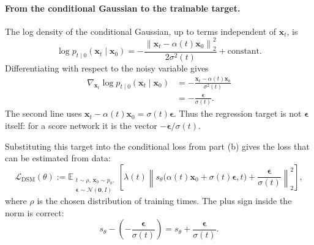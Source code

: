 \documentclass[11pt,a4paper]{article}
\theoremstyle{definition}
\begin{document}
\paragraph{From the conditional Gaussian to the trainable target.}
The log density of the conditional Gaussian, up to terms independent of
$\mathbf{x}_t$, is
\[
\log p_{t\mid 0}(\mathbf{x}_t\mid\mathbf{x}_0)
=-\frac{
\left\|
\mathbf{x}_t-\alpha(t)\mathbf{x}_0
\right\|_2^2}
{2\sigma^2(t)}
+\text{constant}.
\]
Differentiating with respect to the noisy variable gives
\[
\begin{aligned}
\nabla_{\mathbf{x}_t}
\log p_{t\mid 0}(\mathbf{x}_t\mid\mathbf{x}_0)
&=
-\frac{
\mathbf{x}_t-\alpha(t)\mathbf{x}_0}
{\sigma^2(t)}\\
&=
-\frac{\boldsymbol{\epsilon}}{\sigma(t)}.
\end{aligned}
\]
The second line uses
$\mathbf{x}_t-\alpha(t)\mathbf{x}_0
=\sigma(t)\boldsymbol{\epsilon}$. Thus the regression target is not
$\boldsymbol{\epsilon}$ itself: for a score network it is the vector
$-\boldsymbol{\epsilon}/\sigma(t)$.

Substituting this target into the conditional loss from part (b) gives the loss that can
be estimated from data:
\[
\mathcal{L}_{\mathrm{DSM}}(\theta)
:=
\mathbb{E}_{\substack{
t\sim\rho,\,\mathbf{x}_0\sim p_0,\\
\boldsymbol{\epsilon}\sim\mathcal{N}(\mathbf{0},I)}}
\left[
\lambda(t)
\left\|
s_\theta\bigl(
\alpha(t)\mathbf{x}_0+\sigma(t)\boldsymbol{\epsilon},
t
\bigr)
+\frac{\boldsymbol{\epsilon}}{\sigma(t)}
\right\|_2^2
\right],
\]
where $\rho$ is the chosen distribution of training times. The plus sign inside the norm
is correct:
\[
s_\theta-\left(-\frac{\boldsymbol{\epsilon}}{\sigma(t)}\right)
=s_\theta+\frac{\boldsymbol{\epsilon}}{\sigma(t)}.
\]
\end{document}
